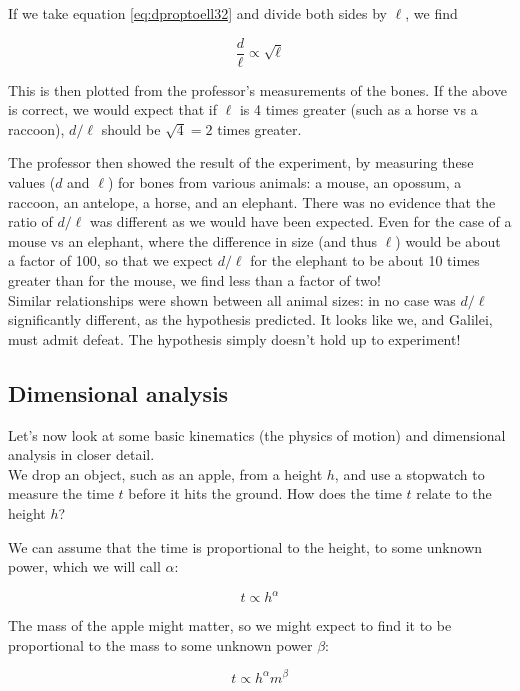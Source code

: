 \documentclass[12pt,a4paper]{report}
\begin{document}
If we take equation \eqref{eq:dproptoell32} and divide both sides by $\ell$, we find

\begin{equation}
\frac{d}{\ell} \propto \sqrt{\ell}
\end{equation}

This is then plotted from the professor's measurements of the bones. If the above is correct, we would expect that if $\ell$ is 4 times greater (such as a horse vs a raccoon), $d/\ell$ should be $\sqrt{4} = 2$ times greater.

The professor then showed the result of the experiment, by measuring these values ($d$ and $\ell$) for bones from various animals: a mouse, an opossum, a raccoon, an antelope, a horse, and an elephant. There was no evidence that the ratio of $d/\ell$ was different as we would have been expected. Even for the case of a mouse vs an elephant, where the difference in size (and thus $\ell$) would be about a factor of 100, so that we expect $d/\ell$ for the elephant to be about 10 times greater than for the mouse, we find less than a factor of two!\\
Similar relationships were shown between all animal sizes: in no case was $d/\ell$ significantly different, as the hypothesis predicted. It looks like we, and Galilei, must admit defeat. The hypothesis simply doesn't hold up to experiment!

\subsection{Dimensional analysis}

Let's now look at some basic kinematics (the physics of motion) and dimensional analysis in closer detail.\\
We drop an object, such as an apple, from a height $h$, and use a stopwatch to measure the time $t$ before it hits the ground. How does the time $t$ relate to the height $h$?

We can assume that the time is proportional to the height, to some unknown power, which we will call $\alpha$:

\begin{equation*}
 t \propto h^\alpha
\end{equation*}

The mass of the apple might matter, so we might expect to find it to be proportional to the mass to some unknown power $\beta$:

\begin{equation*}
 t \propto h^\alpha m^\beta
\end{equation*}
\end{document}
